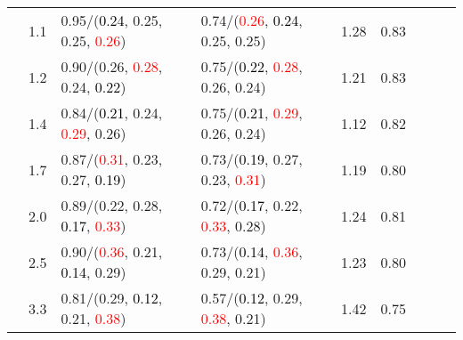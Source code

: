 \documentclass[10pt,a4paper]{report}
\begin{document}
\begin{table}[!htbp]
\begin{center}
{\begin{tabular}{ccllccccc}
				  & 1.1                               & 0.95/(\textcolor{black}{0.24}, 0.25, 0.25, \textcolor{red}{0.26})                                                                               & 0.74/(\textcolor{red}{0.26}, \textcolor{black}{0.24}, 0.25, 0.25)                                                                               & 1.28             & 0.83                     \\
				  & 1.2                               & 0.90/(0.26, \textcolor{red}{0.28}, 0.24, \textcolor{black}{0.22})                                                                               & 0.75/(\textcolor{black}{0.22}, \textcolor{red}{0.28}, 0.26, 0.24)                                                                               & 1.21             & 0.83                     \\
				  & 1.4                               & 0.84/(\textcolor{black}{0.21}, 0.24, \textcolor{red}{0.29}, 0.26)                                                                               & 0.75/(\textcolor{black}{0.21}, \textcolor{red}{0.29}, 0.26, 0.24)                                                                               & 1.12             & 0.82                     \\
				  & 1.7                               & 0.87/(\textcolor{red}{0.31}, 0.23, 0.27, \textcolor{black}{0.19})                                                                               & 0.73/(\textcolor{black}{0.19}, 0.27, 0.23, \textcolor{red}{0.31})                                                                               & 1.19             & 0.80                     \\
				  & 2.0                               & 0.89/(0.22, 0.28, \textcolor{black}{0.17}, \textcolor{red}{0.33})                                                                               & 0.72/(\textcolor{black}{0.17}, 0.22, \textcolor{red}{0.33}, 0.28)                                                                               & 1.24             & 0.81                     \\
				  & 2.5                               & 0.90/(\textcolor{red}{0.36}, 0.21, \textcolor{black}{0.14}, 0.29)                                                                               & 0.73/(\textcolor{black}{0.14}, \textcolor{red}{0.36}, 0.29, 0.21)                                                                               & 1.23             & 0.80                     \\
				  & 3.3                               & 0.81/(0.29, \textcolor{black}{0.12}, 0.21, \textcolor{red}{0.38})                                                                               & 0.57/(\textcolor{black}{0.12}, 0.29, \textcolor{red}{0.38}, 0.21)                                                                               & 1.42             & 0.75                     \\

\end{tabular}}
\end{center}
\end{table}
\end{document}
